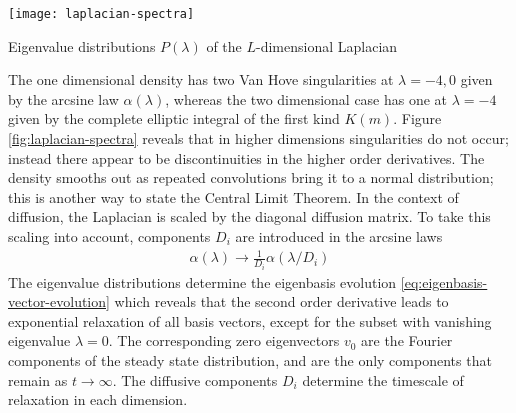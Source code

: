 \begin{Figure}
    \texttt{[image: laplacian-spectra]}
    \caption{Eigenvalue distributions $P(\lambda)$ of the $L$-dimensional Laplacian}
    \label{fig:laplacian-spectra}
\end{Figure}
The one dimensional density has two Van Hove singularities at $\lambda=-4,0$ given by the arcsine law $\alpha(\lambda)$, whereas the two dimensional case has one at $\lambda=-4$ given by the complete elliptic integral of the first kind $K(m)$. Figure \ref{fig:laplacian-spectra} reveals that in higher dimensions singularities do not occur; instead there appear to be discontinuities in the higher order derivatives. The density smooths out as repeated convolutions bring it to a normal distribution; this is another way to state the Central Limit Theorem. In the context of diffusion, the Laplacian is scaled by the diagonal diffusion matrix. To take this scaling into account, components $D_i$ are introduced in the arcsine laws
\begin{align}
	\alpha(\lambda) \rightarrow \frac{1}{D_i}\alpha(\lambda/D_i)
\end{align}
The eigenvalue distributions determine the eigenbasis evolution  \eqref{eq:eigenbasis-vector-evolution} which reveals that the second order derivative leads to exponential relaxation of all basis vectors, except for the subset with vanishing eigenvalue $\lambda=0$. The corresponding zero eigenvectors $v_0$ are the Fourier components of the steady state distribution, and are the only components that remain as $t\rightarrow\infty$. The diffusive components $D_i$ determine the timescale of relaxation in each dimension.


